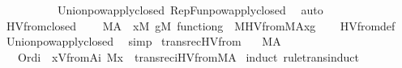 \begin{isabellebody}
\ \ \ \ \ \ \ \ \ \ Union{\isacharunderscore}{\kern0pt}powapply{\isacharunderscore}{\kern0pt}closed\ RepFun{\isacharunderscore}{\kern0pt}powapply{\isacharunderscore}{\kern0pt}closed\ \isamarkupfalse%
\ auto%
\endisatagproof
{\isafoldproof}%
%
\isadelimproof
\isanewline
%
\endisadelimproof
\isanewline
{}\isamarkupfalse%
\ HVfrom{\isacharunderscore}{\kern0pt}closed\ {\isacharcolon}{\kern0pt}\ \isanewline
\ \ {\isachardoublequoteopen}M{\isacharparenleft}{\kern0pt}A{\isacharparenright}{\kern0pt}\ {\isasymLongrightarrow}\ {\isasymforall}x{\isacharbrackleft}{\kern0pt}M{\isacharbrackright}{\kern0pt}{\isachardot}{\kern0pt}\ {\isasymforall}g{\isacharbrackleft}{\kern0pt}M{\isacharbrackright}{\kern0pt}{\isachardot}{\kern0pt}\ function{\isacharparenleft}{\kern0pt}g{\isacharparenright}{\kern0pt}\ {\isasymlongrightarrow}\ M{\isacharparenleft}{\kern0pt}HVfrom{\isacharparenleft}{\kern0pt}M{\isacharcomma}{\kern0pt}A{\isacharcomma}{\kern0pt}x{\isacharcomma}{\kern0pt}g{\isacharparenright}{\kern0pt}{\isacharparenright}{\kern0pt}{\isachardoublequoteclose}\isanewline
%
\isadelimproof
\ \ %
\endisadelimproof
%
\isatagproof
{}\isamarkupfalse%
\ HVfrom{\isacharunderscore}{\kern0pt}def\ \isamarkupfalse%
\ Union{\isacharunderscore}{\kern0pt}powapply{\isacharunderscore}{\kern0pt}closed\ \isamarkupfalse%
\ simp%
\endisatagproof
{\isafoldproof}%
%
\isadelimproof
\isanewline
%
\endisadelimproof
\isanewline
{}\isamarkupfalse%
\ transrec{\isacharunderscore}{\kern0pt}HVfrom{\isacharcolon}{\kern0pt}\isanewline
\ \ \ {\isachardoublequoteopen}M{\isacharparenleft}{\kern0pt}A{\isacharparenright}{\kern0pt}{\isachardoublequoteclose}\isanewline
\ \ \ {\isachardoublequoteopen}Ord{\isacharparenleft}{\kern0pt}i{\isacharparenright}{\kern0pt}\ {\isasymLongrightarrow}\ {\isacharbraceleft}{\kern0pt}x{\isasymin}Vfrom{\isacharparenleft}{\kern0pt}A{\isacharcomma}{\kern0pt}i{\isacharparenright}{\kern0pt}{\isachardot}{\kern0pt}\ M{\isacharparenleft}{\kern0pt}x{\isacharparenright}{\kern0pt}{\isacharbraceright}{\kern0pt}\ {\isacharequal}{\kern0pt}\ transrec{\isacharparenleft}{\kern0pt}i{\isacharcomma}{\kern0pt}HVfrom{\isacharparenleft}{\kern0pt}M{\isacharcomma}{\kern0pt}A{\isacharparenright}{\kern0pt}{\isacharparenright}{\kern0pt}{\isachardoublequoteclose}\isanewline
%
\isadelimproof
%
\endisadelimproof
%
\isatagproof
{}\isamarkupfalse%
\ {\isacharparenleft}{\kern0pt}induct\ rule{\isacharcolon}{\kern0pt}trans{\isacharunderscore}{\kern0pt}induct{\isacharparenright}{\kern0pt}\isanewline

\end{isabellebody}
